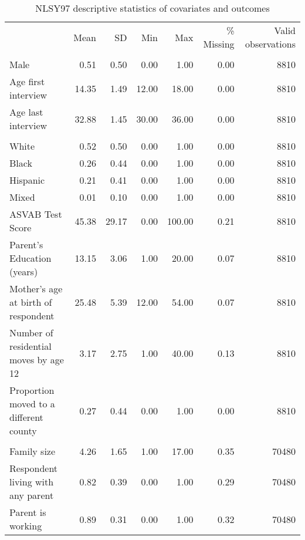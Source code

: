 \begin{table}[htp]
\setlength{\tabcolsep}{3pt}
\renewcommand{\arraystretch}{0.75}
\centering
\begin{threeparttable}
\centering
\caption{NLSY97 descriptive statistics of covariates and outcomes} 
\label{tab:nlsy97_descriptives}
\begingroup\fontsize{9pt}{10pt}\selectfont
\begin{tabular}{lrrrrrr}
  \hline
\addlinespace
  & Mean & SD & Min & Max & \% Missing & Valid observations \\
\addlinespace
 \hline
  \addlinespace
\multicolumn{7}{l}{\textbf{\textit{Time-invariant covariates}}} \\
\addlinespace
Male & 0.51 & 0.50 & 0.00 & 1.00 & 0.00 & 8810 \\ 
  Age first interview & 14.35 & 1.49 & 12.00 & 18.00 & 0.00 & 8810 \\ 
  Age last interview & 32.88 & 1.45 & 30.00 & 36.00 & 0.00 & 8810 \\ 
   \addlinespace
\multicolumn{7}{l}{\textit{Race-Ethnicity}} \\
\quad White & 0.52 & 0.50 & 0.00 & 1.00 & 0.00 & 8810 \\ 
  \quad Black & 0.26 & 0.44 & 0.00 & 1.00 & 0.00 & 8810 \\ 
  \quad Hispanic & 0.21 & 0.41 & 0.00 & 1.00 & 0.00 & 8810 \\ 
  \quad Mixed & 0.01 & 0.10 & 0.00 & 1.00 & 0.00 & 8810 \\ 
   \addlinespace
ASVAB Test Score & 45.38 & 29.17 & 0.00 & 100.00 & 0.21 & 8810 \\ 
  Parent's Education (years) & 13.15 & 3.06 & 1.00 & 20.00 & 0.07 & 8810 \\ 
  Mother's age at birth of respondent & 25.48 & 5.39 & 12.00 & 54.00 & 0.07 & 8810 \\ 
  Number of residential moves by age 12 & 3.17 & 2.75 & 1.00 & 40.00 & 0.13 & 8810 \\ 
  Proportion moved to a different county & 0.27 & 0.44 & 0.00 & 1.00 & 0.00 & 8810 \\ 
   \addlinespace
\multicolumn{7}{l}{\textbf{\textit{Time-variant covariates}}} \\
\addlinespace
Family size & 4.26 & 1.65 & 1.00 & 17.00 & 0.35 & 70480 \\ 
  Respondent living with any parent & 0.82 & 0.39 & 0.00 & 1.00 & 0.29 & 70480 \\ 
  Parent is working & 0.89 & 0.31 & 0.00 & 1.00 & 0.32 & 70480 \\ 

\end{tabular}
\end{threeparttable}
\end{table}
